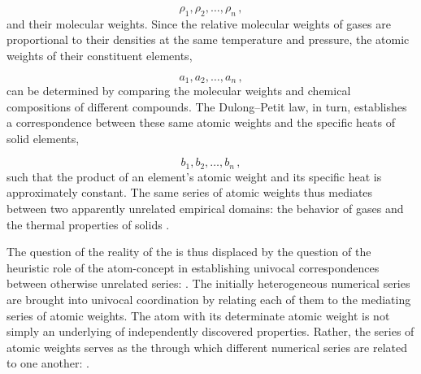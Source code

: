 \documentclass[submitted,12pt]{article}
\renewcommand{\SF}[2]{\citep[#1/#2]{Cassirer1910}}
\begin{document}
\begin{equation*}
\rho_1, \rho_2, \ldots, \rho_n\,,
\end{equation*}
%
and their molecular weights. Since the relative molecular weights of gases are proportional to their densities at the same temperature and pressure, the atomic weights of their constituent elements,

\begin{equation*}
a_1, a_2, \ldots, a_n\,,
\end{equation*}
%
can be determined by comparing the molecular weights and chemical compositions of different compounds. The Dulong--Petit law, in turn, establishes a correspondence between these same atomic weights and the specific heats of solid elements,

\begin{equation*}
b_1, b_2, \ldots, b_n\,,
\end{equation*}
%
such that the product of an element's atomic weight and its specific heat is approximately constant. The same series of atomic weights thus mediates between two apparently unrelated empirical domains: the behavior of gases and the thermal properties of solids \SF{276--77}{208}.

The question of the reality of the  is thus displaced by the question of the heuristic role of the atom-concept in establishing univocal correspondences between otherwise unrelated series:  \SF{277}{208}. The initially heterogeneous numerical series are brought into univocal coordination  by relating each of them to the mediating series of atomic weights. The atom with its determinate atomic weight is not simply an underlying  of independently discovered properties. Rather, the series of atomic weights serves as the  through which different numerical series are related to one another:  \SF{277}{208}.
\end{document}
